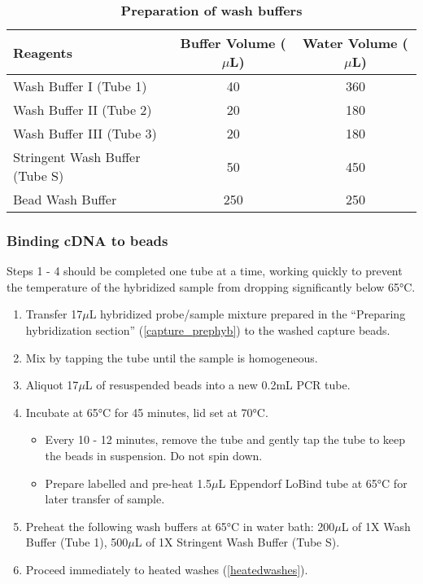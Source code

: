 \vspace{1cm}
\begin{table}[h]
	\centering	
	\caption[Preparation of wash buffers]%
	{\textbf{Preparation of wash buffers}}
	\label{tab:washbuffer}	
	\begin{tabularx}{0.9\textwidth}{lcc}
		\toprule
		Reagents                       & Buffer Volume ($\mu$L) & Water Volume ($\mu$L) \\ \midrule
		Wash Buffer I (Tube 1)         & 40                 & 360              \\
		Wash Buffer II (Tube 2)        & 20                 & 180              \\
		Wash Buffer III (Tube 3)      & 20                 & 180              \\
		Stringent Wash Buffer (Tube S) & 50                 & 450              \\
		Bead Wash Buffer               & 250                & 250              \\ \bottomrule
	\end{tabularx}
\end{table}

\subsubsection{Binding cDNA to beads}
Steps 1 - 4 should be completed one tube at a time, working quickly to prevent the temperature of the hybridized sample from dropping significantly below 65°C.
\begin{enumerate}
	\item Transfer 17$\mu$L hybridized probe/sample mixture prepared in the “Preparing hybridization section” (\cref{capture_prephyb}) to the washed capture beads.
	\item Mix by tapping the tube until the sample is homogeneous. 
	\item Aliquot 17$\mu$L of resuspended beads into a new 0.2mL PCR tube. 
	\item Incubate at 65°C for 45 minutes, lid set at 70°C.
	\begin{itemize}
		\item Every 10 - 12 minutes, remove the tube and gently tap the tube to keep the beads in suspension. Do not spin down.
		\item Prepare labelled and pre-heat 1.5$\mu$L Eppendorf LoBind tube at 65°C for later transfer of sample. 
	\end{itemize} 
	\item Preheat the following wash buffers at 65°C in water bath: 200$\mu$L of 1X Wash Buffer (Tube 1), 500$\mu$L of 1X Stringent Wash Buffer (Tube S).
	\item Proceed immediately to heated washes (\cref{heatedwashes}).
\end{enumerate} 

